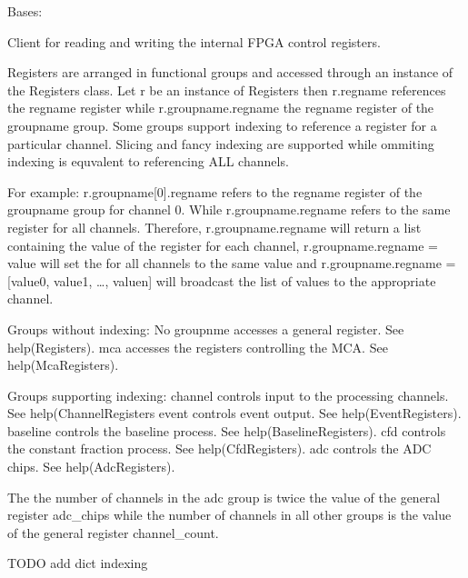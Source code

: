 \documentclass[letterpaper,10pt,english]{sphinxmanual}
\begin{document}
\begin{fulllineitems}
\label{\detokenize{tes:tes.registers.Registers}}
\sphinxAtStartPar
Bases: 

\sphinxAtStartPar
Client for reading and writing the internal FPGA control registers.

\sphinxAtStartPar
Registers are arranged in functional groups and accessed through an
instance of the Registers class. Let r be an instance of Registers
then r.regname  references the regname register while r.groupname.regname
the regname register of the  groupname group. Some groups support
indexing to reference a register for a particular channel. Slicing and
fancy indexing are supported while ommiting indexing is equvalent  to
referencing ALL channels.

\sphinxAtStartPar
For example:
r.groupname{[}0{]}.regname refers to the regname register of the groupname group
for channel 0. While r.groupname.regname refers to the same register for all
channels. Therefore, r.groupname.regname will return a list containing the
value of the register for each channel, r.groupname.regname = value will set
the for all channels to the same value and
r.groupname.regname = {[}value0, value1, …, valuen{]} will broadcast the list
of values to the appropriate channel.

\sphinxAtStartPar
Groups without indexing:
No groupnme \sphinxhyphen{} accesses a general register. See help(Registers).
mca \sphinxhyphen{} accesses the registers controlling the MCA. See help(McaRegisters).

\sphinxAtStartPar
Groups supporting indexing:
channel controls input to the processing channels. See help(ChannelRegisters
event  controls event output. See help(EventRegisters).
baseline  controls the baseline process. See help(BaselineRegisters).
cfd  controls the constant fraction process. See help(CfdRegisters).
adc  controls the ADC chips. See help(AdcRegisters).

\sphinxAtStartPar
The the number of channels in the adc group is twice the value of the
general register adc\_chips while the number of channels in all other
groups is the value of the general register channel\_count.

\sphinxAtStartPar
TODO add dict indexing


\end{fulllineitems}
\end{document}
